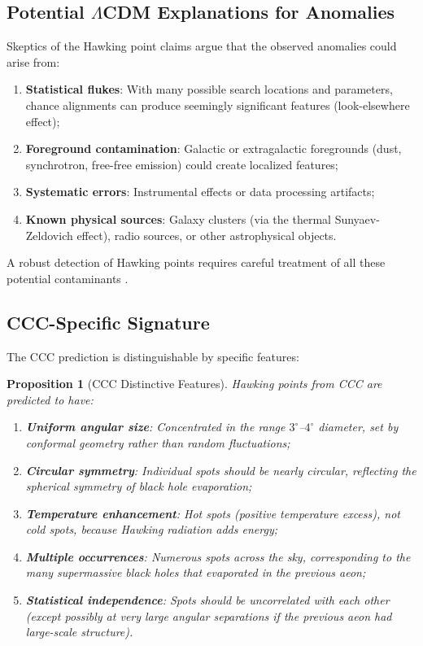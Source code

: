 \documentclass[11pt,a4paper]{article}
\theoremstyle{plain}
\newtheorem{proposition}[theorem]{Proposition}
\theoremstyle{definition}
\theoremstyle{remark}
\begin{document}
\subsection{Potential \texorpdfstring{$\Lambda$CDM}{LCDM} Explanations for Anomalies}

Skeptics of the Hawking point claims argue that the observed anomalies could arise from:

\begin{enumerate}
    \item \textbf{Statistical flukes}: With many possible search locations and parameters, chance alignments can produce seemingly significant features (look-elsewhere effect);
    \item \textbf{Foreground contamination}: Galactic or extragalactic foregrounds (dust, synchrotron, free-free emission) could create localized features;
    \item \textbf{Systematic errors}: Instrumental effects or data processing artifacts;
    \item \textbf{Known physical sources}: Galaxy clusters (via the thermal Sunyaev-Zeldovich effect), radio sources, or other astrophysical objects.
\end{enumerate}

A robust detection of Hawking points requires careful treatment of all these potential contaminants \cite{ccc_wiki,hawking_points_2020}.

\subsection{CCC-Specific Signature}

The CCC prediction is distinguishable by specific features:

\begin{proposition}[CCC Distinctive Features]\label{prop:ccc_features}
Hawking points from CCC are predicted to have:
\begin{enumerate}
    \item \textbf{Uniform angular size}: Concentrated in the range $3^\circ$--$4^\circ$ diameter, set by conformal geometry rather than random fluctuations;
    \item \textbf{Circular symmetry}: Individual spots should be nearly circular, reflecting the spherical symmetry of black hole evaporation;
    \item \textbf{Temperature enhancement}: Hot spots (positive temperature excess), not cold spots, because Hawking radiation adds energy;
    \item \textbf{Multiple occurrences}: Numerous spots across the sky, corresponding to the many supermassive black holes that evaporated in the previous aeon;
    \item \textbf{Statistical independence}: Spots should be uncorrelated with each other (except possibly at very large angular separations if the previous aeon had large-scale structure).
\end{enumerate}
\end{proposition}
\end{document}

